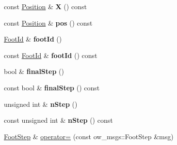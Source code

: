 \begin{DoxyCompactItemize}
\item 
const \hyperlink{classow__core_1_1CartesianPosition}{Position} \& {\bfseries X} () const \hypertarget{classow__core_1_1FootStep_ac682ca1e536637b4076c1ba5ffc54be0}{}\label{classow__core_1_1FootStep_ac682ca1e536637b4076c1ba5ffc54be0}

\item 
const \hyperlink{classow__core_1_1CartesianPosition}{Position} \& {\bfseries pos} () const \hypertarget{classow__core_1_1FootStep_a8071b6e686955df50ff867ea59efd3b5}{}\label{classow__core_1_1FootStep_a8071b6e686955df50ff867ea59efd3b5}

\item 
\hyperlink{foot__id_8h_a57e66d30579b22cfe2c17c739278e5a6}{Foot\+Id} \& {\bfseries foot\+Id} ()\hypertarget{classow__core_1_1FootStep_a850e9e9e9dc11c6cf38832af3b00cd09}{}\label{classow__core_1_1FootStep_a850e9e9e9dc11c6cf38832af3b00cd09}

\item 
const \hyperlink{foot__id_8h_a57e66d30579b22cfe2c17c739278e5a6}{Foot\+Id} \& {\bfseries foot\+Id} () const \hypertarget{classow__core_1_1FootStep_a1fe2e0fffdb4da4d8c44997a7370fbdb}{}\label{classow__core_1_1FootStep_a1fe2e0fffdb4da4d8c44997a7370fbdb}

\item 
bool \& {\bfseries final\+Step} ()\hypertarget{classow__core_1_1FootStep_ae380d9c9754281e8aa7b8157fb0c0bfd}{}\label{classow__core_1_1FootStep_ae380d9c9754281e8aa7b8157fb0c0bfd}

\item 
const bool \& {\bfseries final\+Step} () const \hypertarget{classow__core_1_1FootStep_a698fe08a400f65f29afeed5d40c5de48}{}\label{classow__core_1_1FootStep_a698fe08a400f65f29afeed5d40c5de48}

\item 
unsigned int \& {\bfseries n\+Step} ()\hypertarget{classow__core_1_1FootStep_aa044fad0fdeb4d95bdf3d2b4c49b89aa}{}\label{classow__core_1_1FootStep_aa044fad0fdeb4d95bdf3d2b4c49b89aa}

\item 
const unsigned int \& {\bfseries n\+Step} () const \hypertarget{classow__core_1_1FootStep_a47505a1351468552618c9f779e5636d7}{}\label{classow__core_1_1FootStep_a47505a1351468552618c9f779e5636d7}

\item 
\hyperlink{classow__core_1_1FootStep}{Foot\+Step} \& \hyperlink{classow__core_1_1FootStep_ae5b28070488d537788ef59d6228d2b9a}{operator=} (const ow\+\_\+msgs\+::\+Foot\+Step \&msg)\hypertarget{classow__core_1_1FootStep_ae5b28070488d537788ef59d6228d2b9a}{}\label{classow__core_1_1FootStep_ae5b28070488d537788ef59d6228d2b9a}


\end{DoxyCompactItemize}

